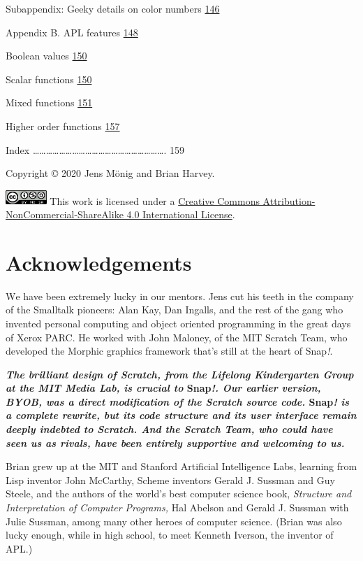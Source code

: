 Subappendix: Geeky details on color numbers
\hyperref[subappendix-geeky-details-on-color-numbers]{146}

Appendix B. APL features \hyperref[appendix-b.-apl-features]{148}

Boolean values \hyperref[boolean-values]{150}

Scalar functions \hyperref[scalar-functions]{150}

Mixed functions \hyperref[mixed-functions]{151}

Higher order functions \hyperref[higher-order-functions]{157}

Index
\ldots\ldots\ldots\ldots\ldots\ldots\ldots\ldots\ldots\ldots\ldots\ldots\ldots\ldots\ldots\ldots\ldots\ldots\ldots\ldots.
159

Copyright © 2020 Jens Mönig and Brian Harvey.

\includegraphics[width=0.61111in,height=0.21528in]{media/image4.png}
This work is licensed under a
\href{https://creativecommons.org/licenses/by-nc-sa/4.0/}{Creative
Commons Attribution-NonCommercial-ShareAlike 4.0 International License}.

\section{Acknowledgements}\label{acknowledgements}

\textsc{W}e have been extremely lucky in our mentors. Jens cut his teeth
in the company of the Smalltalk pioneers: Alan Kay, Dan Ingalls, and the
rest of the gang who invented personal computing and object oriented
programming in the great days of Xerox PARC. He worked with John
Maloney, of the MIT Scratch Team, who developed the Morphic graphics
framework that's still at the heart of Snap\emph{!}.

\textbf{\emph{The brilliant design of Scratch, from the Lifelong
Kindergarten Group at the MIT Media Lab, is crucial to} Snap\emph{!. Our
earlier version, BYOB, was a direct modification of the Scratch source
code.} Snap\emph{! is a complete rewrite, but its code structure and its
user interface remain deeply indebted to Scratch. And the Scratch Team,
who could have seen us as rivals, have been entirely supportive and
welcoming to us.}}

Brian grew up at the MIT and Stanford Artificial Intelligence Labs,
learning from Lisp inventor John McCarthy, Scheme inventors Gerald J.
Sussman and Guy Steele, and the authors of the world's best computer
science book, \emph{Structure and Interpretation of Computer Programs,}
Hal Abelson and Gerald J. Sussman with Julie Sussman, among many other
heroes of computer science. (Brian was also lucky enough, while in high
school, to meet Kenneth Iverson, the inventor of APL.)

